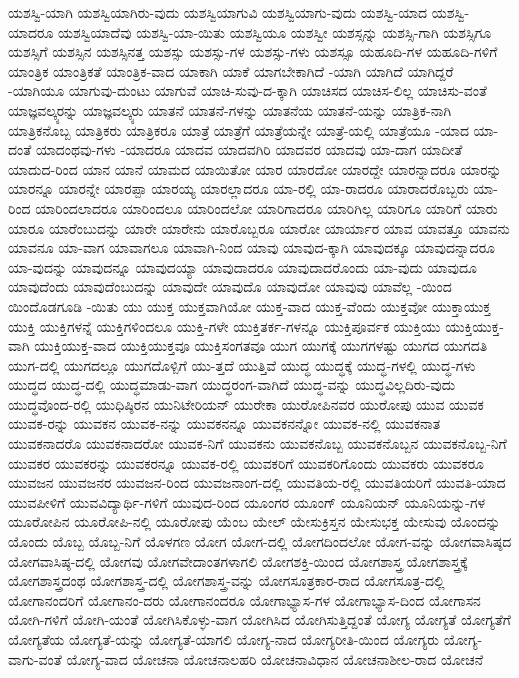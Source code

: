{ಯಶಸ್ವಿ-ಯಾಗಿ
ಯಶಸ್ವಿಯಾಗಿರು-ವುದು
ಯಶಸ್ವಿಯಾಗುವಿ
ಯಶಸ್ವಿಯಾಗು-ವುದು
ಯಶಸ್ವಿ-ಯಾದ
ಯಶಸ್ವಿ-ಯಾದರೂ
ಯಶಸ್ವಿಯಾದೆವು
ಯಶಸ್ವಿ-ಯಾ-ಯಿತು
ಯಶಸ್ವಿಯೂ
ಯಶಸ್ವೀ
ಯಶಸ್ಸನ್ನು
ಯಶಸ್ಸಿ-ಗಾಗಿ
ಯಶಸ್ಸಿಗೂ
ಯಶಸ್ಸಿಗೆ
ಯಶಸ್ಸಿನ
ಯಶಸ್ಸಿನತ್ತ
ಯಶಸ್ಸು
ಯಶಸ್ಸು-ಗಳ
ಯಶಸ್ಸು-ಗಳು
ಯಶಸ್ಸೂ
ಯಹೂದಿ-ಗಳ
ಯಹೂದಿ-ಗಳಿಗೆ
ಯಾಂತ್ರಿಕ
ಯಾಂತ್ರಿಕತೆ
ಯಾಂತ್ರಿಕ-ವಾದ
ಯಾಕಾಗಿ
ಯಾಕೆ
ಯಾಗಬೇಕಾಗಿದೆ
-ಯಾಗಿ
ಯಾಗಿದೆ
ಯಾಗಿದ್ದರೆ
-ಯಾಗಿಯೂ
ಯಾಗುವು-ದುಂಟು
ಯಾಗುವೆ
ಯಾಚಿ-ಸುವು-ದ-ಕ್ಕಾಗಿ
ಯಾಚಿಸದ
ಯಾಚಿಸ-ಲಿಲ್ಲ
ಯಾಚಿಸು-ವಂತೆ
ಯಾಜ್ಞವಲ್ಕ್ಯರನ್ನು
ಯಾಜ್ಞವಲ್ಕ್ಯರು
ಯಾತನೆ
ಯಾತನೆ-ಗಳನ್ನು
ಯಾತನೆಯ
ಯಾತನೆ-ಯನ್ನು
ಯಾತ್ರಿಕ-ನಾಗಿ
ಯಾತ್ರಿಕನೊಬ್ಬ
ಯಾತ್ರಿಕರು
ಯಾತ್ರಿಕರೂ
ಯಾತ್ರೆ
ಯಾತ್ರೆಗೆ
ಯಾತ್ರೆಯನ್ನೇ
ಯಾತ್ರೆ-ಯಲ್ಲಿ
ಯಾತ್ರೆಯೂ
-ಯಾದ
ಯಾ-ದಂತೆ
ಯಾದಂಥವು-ಗಳು
-ಯಾದರೂ
ಯಾದವ
ಯಾದವಗಿರಿ
ಯಾದವರ
ಯಾದವು
ಯಾ-ದಾಗ
ಯಾದೀತೆ
ಯಾದುದ-ರಿಂದ
ಯಾನ
ಯಾನೆ
ಯಾಮದ
ಯಾಯಿತೋ
ಯಾರ
ಯಾರದೋ
ಯಾರದ್ದೇ
ಯಾರನ್ನಾದರೂ
ಯಾರನ್ನು
ಯಾರನ್ನೂ
ಯಾರನ್ನೇ
ಯಾರಪ್ಪಾ
ಯಾರಯ್ಯ
ಯಾರಲ್ಲಾದರೂ
ಯಾ-ರಲ್ಲಿ
ಯಾ-ರಾದರೂ
ಯಾರಾದರೊಬ್ಬರು
ಯಾ-ರಿಂದ
ಯಾರಿಂದಲಾದರೂ
ಯಾರಿಂದಲೂ
ಯಾರಿಂದಲೋ
ಯಾರಿಗಾದರೂ
ಯಾರಿಗಿಲ್ಲ
ಯಾರಿಗೂ
ಯಾರಿಗೆ
ಯಾರು
ಯಾರೂ
ಯಾರೆಂಬುದನ್ನು
ಯಾರೇ
ಯಾರೇನು
ಯಾರೊಬ್ಬರೂ
ಯಾರೋ
ಯಾರ್ಯಾರ
ಯಾವ
ಯಾವತ್ತೂ
ಯಾವನು
ಯಾವನೂ
ಯಾ-ವಾಗ
ಯಾವಾಗಲೂ
ಯಾವಾಗಿ-ನಿಂದ
ಯಾವು
ಯಾವುದ-ಕ್ಕಾಗಿ
ಯಾವುದಕ್ಕೂ
ಯಾವುದನ್ನಾದರೂ
ಯಾ-ವುದನ್ನು
ಯಾವುದನ್ನೂ
ಯಾವುದಯ್ಯಾ
ಯಾವುದಾದರೂ
ಯಾವುದಾದರೊಂದು
ಯಾ-ವುದು
ಯಾವುದೂ
ಯಾವುದೆಂದು
ಯಾವುದೆಂಬುದನ್ನು
ಯಾವುದೇ
ಯಾವುದೊ
ಯಾವುದೋ
ಯಾವುವು
ಯಾವೆಲ್ಲ
-ಯಿಂದ
ಯಿಂದೊಡಗೂಡಿ
-ಯಿತು
ಯು
ಯುಕ್ತ
ಯುಕ್ತವಾಗಿಯೋ
ಯುಕ್ತ-ವಾದ
ಯುಕ್ತ-ವೆಂದು
ಯುಕ್ತವೋ
ಯುಕ್ತಾಯುಕ್ತ
ಯುಕ್ತಿ
ಯುಕ್ತಿಗಳನ್ನೆ
ಯುಕ್ತಿಗಳಿಂದಲೂ
ಯುಕ್ತಿ-ಗಳೇ
ಯುಕ್ತಿತರ್ಕ-ಗಳನ್ನೂ
ಯುಕ್ತಿಪೂರ್ವಕ
ಯುಕ್ತಿಯು
ಯುಕ್ತಿಯುಕ್ತ-ವಾಗಿ
ಯುಕ್ತಿಯುಕ್ತ-ವಾದ
ಯುಕ್ತಿಯುಕ್ತವೂ
ಯುಕ್ತಿಸಂಗತವೂ
ಯುಗ
ಯುಗಕ್ಕೆ
ಯುಗಗಳಷ್ಟು
ಯುಗದ
ಯುಗದತಿ
ಯುಗ-ದಲ್ಲಿ
ಯುಗದಲ್ಲೂ
ಯುಗದೊಳ್ಪಿಗೆ
ಯು-ತ್ತದೆ
ಯುತ್ತಿವೆ
ಯುದ್ಧ
ಯುದ್ಧಕ್ಕೆ
ಯುದ್ಧ-ಗಳಲ್ಲಿ
ಯುದ್ಧ-ಗಳು
ಯುದ್ಧದ
ಯುದ್ಧ-ದಲ್ಲಿ
ಯುದ್ಧಮಾಡು-ವಾಗ
ಯುದ್ಧರಂಗ-ವಾಗಿದೆ
ಯುದ್ಧ-ವನ್ನು
ಯುದ್ಧವಿಲ್ಲದಿರು-ವುದು
ಯುದ್ಧವೊಂದ-ರಲ್ಲಿ
ಯುಧಿಷ್ಠಿರನ
ಯುನಿಟೇರಿಯನ್
ಯುರೇಕಾ
ಯುರೋಪಿನವರ
ಯುರೋಪು
ಯುವ
ಯುವಕ
ಯುವಕ-ರನ್ನು
ಯುವಕನ
ಯುವಕ-ನನ್ನು
ಯುವಕನನ್ನೂ
ಯುವಕನನ್ನೋ
ಯುವಕ-ನಲ್ಲಿ
ಯುವಕನಾತ
ಯುವಕನಾದರೊ
ಯುವಕನಾದರೋ
ಯುವಕ-ನಿಗೆ
ಯುವಕನು
ಯುವಕನೊಬ್ಬ
ಯುವಕನೊಬ್ಬನ
ಯುವಕನೊಬ್ಬ-ನಿಗೆ
ಯುವಕರ
ಯುವಕರನ್ನು
ಯುವಕರನ್ನೂ
ಯುವಕ-ರಲ್ಲಿ
ಯುವಕರಿಗೆ
ಯುವಕರಿಗೊಂದು
ಯುವಕರು
ಯುವಕರೂ
ಯುವಜನ
ಯುವಜನರ
ಯುವಜನ-ರಿಂದ
ಯುವಜನಾಂಗ-ದಲ್ಲಿ
ಯುವತಿಯ-ರಲ್ಲಿ
ಯುವತಿಯರಿಗೆ
ಯುವತಿ-ಯಾದ
ಯುವಪೀಳಿಗೆ
ಯುವವಿದ್ಯಾರ್ಥಿ-ಗಳಿಗೆ
ಯುವುದ-ರಿಂದ
ಯೂಂಗರ
ಯೂಂಗ್
ಯೂನಿಯನ್
ಯೂನಿಯನ್ನು-ಗಳ
ಯೂರೋಪಿನ
ಯೂರೋಪಿ-ನಲ್ಲಿ
ಯೂರೋಪು
ಯೆಂಬ
ಯೇಲ್
ಯೇಸುಕ್ರಿಸ್ತನ
ಯೇಸುಭಕ್ತ
ಯೇಸುವು
ಯೊಂದನ್ನು
ಯೊಂದು
ಯೊಬ್ಬ
ಯೊಬ್ಬ-ನಿಗೆ
ಯೊಳಗಣ
ಯೋಗ
ಯೋಗ-ದಲ್ಲಿ
ಯೋಗದಿಂದಲೋ
ಯೋಗ-ವನ್ನು
ಯೋಗವಾಸಿಷ್ಠದ
ಯೋಗವಾಸಿಷ್ಠ-ದಲ್ಲಿ
ಯೋಗವು
ಯೋಗವೇದಾಂತಗಳಾಗಲಿ
ಯೋಗಶಕ್ತಿ-ಯಿಂದ
ಯೋಗಶಾಸ್ತ್ರ
ಯೋಗಶಾಸ್ತ್ರಕ್ಕೆ
ಯೋಗಶಾಸ್ತ್ರದಂಥ
ಯೋಗಶಾಸ್ತ್ರ-ದಲ್ಲಿ
ಯೋಗಶಾಸ್ತ್ರ-ವನ್ನು
ಯೋಗಸೂತ್ರಕಾರ-ರಾದ
ಯೋಗಸೂತ್ರ-ದಲ್ಲಿ
ಯೋಗಾನಂದರಿಗೆ
ಯೋಗಾನಂ-ದರು
ಯೋಗಾನಂದರೂ
ಯೋಗಾಭ್ಯಾಸ-ಗಳ
ಯೋಗಾಭ್ಯಾಸ-ದಿಂದ
ಯೋಗಾಸನ
ಯೋಗಿ-ಗಳಿಗೆ
ಯೋಗಿ-ಯಂತೆ
ಯೋಗಿಸಿಕೊಳ್ಳು-ವಾಗ
ಯೋಗಿಸಿದ
ಯೋಗಿಸುತ್ತಿದ್ದಂತೆ
ಯೋಗ್ಯ
ಯೋಗ್ಯತೆ
ಯೋಗ್ಯತೆಗೆ
ಯೋಗ್ಯತೆಯ
ಯೋಗ್ಯತೆ-ಯನ್ನು
ಯೋಗ್ಯತೆ-ಯಾಗಲಿ
ಯೋಗ್ಯ-ನಾದ
ಯೋಗ್ಯರೀತಿ-ಯಿಂದ
ಯೋಗ್ಯರು
ಯೋಗ್ಯ-ವಾಗು-ವಂತೆ
ಯೋಗ್ಯ-ವಾದ
ಯೋಚನಾ
ಯೋಚನಾಲಹರಿ
ಯೋಚನಾವಿಧಾನ
ಯೋಚನಾಶೀಲ-ರಾದ
ಯೋಚನೆ
}
